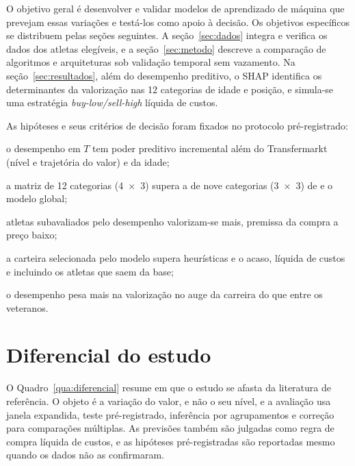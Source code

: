 \documentclass[article, 12pt, oneside, a4paper, english, brazil, section=TITLE]{abntex2}
\begin{document}
O objetivo geral é desenvolver e validar modelos de aprendizado de máquina que prevejam essas variações e testá-los como apoio à decisão.
Os objetivos específicos se distribuem pelas seções seguintes.
A seção~\ref{sec:dados} integra e verifica os dados dos atletas elegíveis, e a seção~\ref{sec:metodo} descreve a comparação de algoritmos e arquiteturas sob validação temporal sem vazamento.
Na seção~\ref{sec:resultados}, além do desempenho preditivo, o SHAP identifica os determinantes da valorização nas 12 categorias de idade e posição, e simula-se uma estratégia \textit{buy-low/sell-high} líquida de custos.

As hipóteses e seus critérios de decisão foram fixados no protocolo pré-registrado:

\begin{alineas}[label=H\arabic*:]
  \item o desempenho em $T$ tem poder preditivo incremental além do Transfermarkt (nível e trajetória do valor) e da idade;
  \item a matriz de 12 categorias (4~×~3) supera a de nove categorias (3~×~3) de \textcite{khalife2025} e o modelo global;
  \item atletas subavaliados pelo desempenho valorizam-se mais, premissa da compra a preço baixo;
  \item a carteira selecionada pelo modelo supera heurísticas e o acaso, líquida de custos e incluindo os atletas que saem da base;
  \item o desempenho pesa mais na valorização no auge da carreira do que entre os veteranos.
\end{alineas}

\section{Diferencial do estudo}

O Quadro~\ref{qua:diferencial} resume em que o estudo se afasta da literatura de referência.
O objeto é a variação do valor, e não o seu nível, e a avaliação usa janela expandida, teste pré-registrado, inferência por agrupamentos e correção para comparações múltiplas.
As previsões também são julgadas como regra de compra líquida de custos, e as hipóteses pré-registradas são reportadas mesmo quando os dados não as confirmaram.
\end{document}
